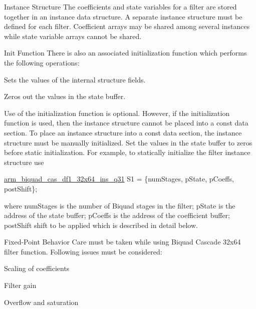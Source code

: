 \begin{DoxyParagraph}{Instance Structure }
The coefficients and state variables for a filter are stored together in an instance data structure. A separate instance structure must be defined for each filter. Coefficient arrays may be shared among several instances while state variable arrays cannot be shared.
\end{DoxyParagraph}
\begin{DoxyParagraph}{Init Function }
There is also an associated initialization function which performs the following operations\-:
\begin{DoxyItemize}
\item Sets the values of the internal structure fields.
\item Zeros out the values in the state buffer. 
\end{DoxyItemize}
\end{DoxyParagraph}
\begin{DoxyParagraph}{}
Use of the initialization function is optional. However, if the initialization function is used, then the instance structure cannot be placed into a const data section. To place an instance structure into a const data section, the instance structure must be manually initialized. Set the values in the state buffer to zeros before static initialization. For example, to statically initialize the filter instance structure use 
\begin{DoxyPre}   
    \hyperlink{structarm__biquad__cas__df1__32x64__ins__q31}{arm\_biquad\_cas\_df1\_32x64\_ins\_q31} S1 = \{numStages, pState, pCoeffs, postShift\};   
\end{DoxyPre}
 where {\ttfamily num\-Stages} is the number of Biquad stages in the filter; {\ttfamily p\-State} is the address of the state buffer; {\ttfamily p\-Coeffs} is the address of the coefficient buffer; {\ttfamily post\-Shift} shift to be applied which is described in detail below. 
\end{DoxyParagraph}
\begin{DoxyParagraph}{Fixed-\/\-Point Behavior }
Care must be taken while using Biquad Cascade 32x64 filter function. Following issues must be considered\-:
\begin{DoxyItemize}
\item Scaling of coefficients
\item Filter gain
\item Overflow and saturation
\end{DoxyItemize}
\end{DoxyParagraph}
